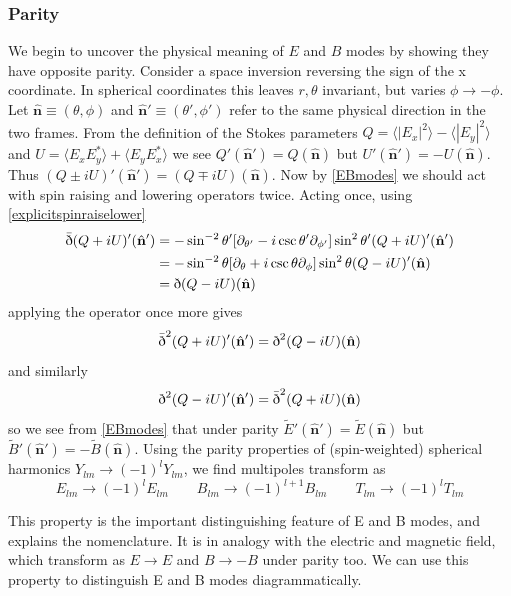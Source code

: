 \documentclass[a4paper,10pt]{article}
\renewcommand{\v}[1]{\mathbf{#1}}
\newcommand{\unit}[1]{\hat{\v{#1}}}
\newcommand{\sr}{\text{\normalfont\dh}}
\renewcommand{\sl}{\bar{\text{\normalfont\dh}}}
\begin{document}
\subsubsection{Parity}

We begin to uncover the physical meaning of $E$ and $B$ modes by showing they have opposite parity. Consider a space inversion reversing the sign of the x coordinate. In spherical coordinates this leaves $r, \theta$ invariant, but varies $\phi \rightarrow -\phi$.  Let $\unit{n}\equiv(\theta, \phi)$ and $\unit{n}'\equiv(\theta', \phi')$ refer to the same physical direction in the two frames. From the definition of the Stokes parameters $Q=\langle |E_x|^2 \rangle - \langle |E_y|^2 \rangle$ and $U = \langle E_xE_y^* \rangle + \langle E_yE_x^* \rangle$ we see $Q'(\unit{n}') = Q(\unit{n})$ but $U'(\unit{n}') = -U(\unit{n})$. Thus $(Q\pm iU)'(\unit{n}') = (Q\mp iU)(\unit{n})$. Now by \ref{EBmodes} we should act with spin raising and lowering operators twice. Acting once, using \ref{explicitspinraiselower}
\begin{equation}\begin{split}
\sl(Q+iU)'(\unit{n}') &= -\sin^{-2}{\theta'}[\partial_{\theta'}-i\csc{\theta'}\partial_{\phi'}]\sin^{2}{\theta'}(Q+iU)'(\unit{n}')\\
&= -\sin^{-2}{\theta}[\partial_{\theta}+i\csc{\theta}\partial_{\phi}]\sin^{2}{\theta}(Q-iU)'(\unit{n})\\
&= \sr (Q-iU)(\unit{n})
\end{split}\end{equation}
applying the operator once more gives
\begin{equation}
\sl^2(Q+iU)'(\unit{n}') = \sr^2 (Q-iU)(\unit{n})
\end{equation}
and similarly
\begin{equation}
\sr^2(Q-iU)'(\unit{n}') = \sl^2 (Q+iU)(\unit{n})
\end{equation}
so we see from \ref{EBmodes} that under parity $\tilde{E}'(\unit{n}')=\tilde{E}(\unit{n})$ but $\tilde{B}'(\unit{n}')=-\tilde{B}(\unit{n})$. Using the parity properties of (spin-weighted) spherical harmonics $Y_{lm}\rightarrow(-1)^lY_{lm}$, we find multipoles transform as
\begin{equation}
E_{lm} \rightarrow (-1)^lE_{lm} \qquad B_{lm} \rightarrow (-1)^{l+1}B_{lm} \qquad T_{lm} \rightarrow (-1)^lT_{lm}
\end{equation} 

This property is the important distinguishing feature of E and B modes, and explains the nomenclature. It is in analogy with the electric and magnetic field, which transform as $E\rightarrow E$ and $B\rightarrow -B$ under parity too. We can use this property to distinguish E and B modes diagrammatically.
\end{document}
